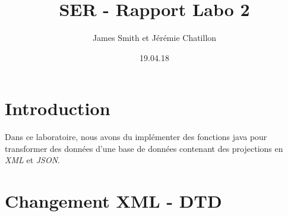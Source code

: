 \documentclass[]{article}
\author{James Smith et Jérémie Chatillon}
\date{19.04.18}
\title{SER - Rapport Labo 2}
\begin{document}
\maketitle

\newpage

\section{Introduction}\label{header-n5}

Dans ce laboratoire, nous avons du implémenter des fonctions java pour
transformer des données d'une base de données contenant des projections
en \emph{XML} et \emph{JSON}.

\section{Changement XML - DTD}\label{header-n18}
\end{document}
